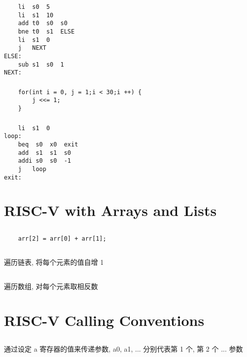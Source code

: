 \documentclass[UTF8,10pt,a4paper]{ctexart}
\begin{document}
\subsubsection{}
\begin{verbatim}
    li  s0  5
    li  s1  10
    add t0  s0  s0
    bne t0  s1  ELSE
    li  s1  0
    j   NEXT
ELSE:
    sub s1  s0  1
NEXT:

\end{verbatim}
\subsubsection{}
\begin{verbatim}
    for(int i = 0, j = 1;i < 30;i ++) {
        j <<= 1;
    }
\end{verbatim}
\subsubsection{}
\begin{verbatim}
    li  s1  0
loop:
    beq  s0  x0  exit
    add  s1  s1  s0
    addi s0  s0  -1
    j   loop
exit:

\end{verbatim}
\section{RISC-V with Arrays and Lists}
\subsection{}
\begin{verbatim}
    arr[2] = arr[0] + arr[1];
\end{verbatim}
\subsection{}
遍历链表, 将每个元素的值自增 1
\subsection{}
遍历数组, 对每个元素取相反数
\section{RISC-V Calling Conventions}
\subsection{}
通过设定 a 寄存器的值来传递参数, a0, a1, ... 分别代表第 1 个, 第 2 个 ... 参数
\end{document}
